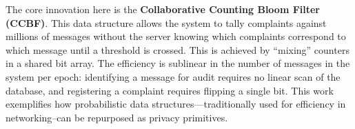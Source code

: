 The core innovation here is the \textbf{Collaborative Counting Bloom Filter (CCBF)}. This data structure allows the system to tally complaints against millions of messages without the server knowing which complaints correspond to which message until a threshold is crossed. This is achieved by ``mixing'' counters in a shared bit array. The efficiency is sublinear in the number of messages in the system per epoch: identifying a message for audit requires no linear scan of the database, and registering a complaint requires flipping a single bit. This work exemplifies how probabilistic data structures—traditionally used for efficiency in networking--can be repurposed as privacy primitives.





